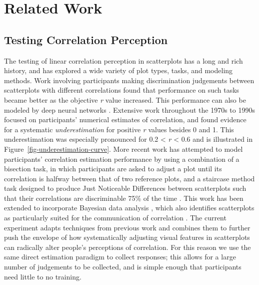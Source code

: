 \documentclass[sigconf]{acmart}
\begin{document}
\hypertarget{sec-related-work}{%
\section{Related Work}\label{sec-related-work}}

\hypertarget{sec-testing-corr-percept}{%
\subsection{Testing Correlation
Perception}\label{sec-testing-corr-percept}}

The testing of linear correlation perception in scatterplots has a long
and rich history, and has explored a wide variety of plot types, tasks,
and modeling methods. Work involving participants making discrimination
judgements between scatterplots with different correlations
\citep{pollack_1960, doherty_2007} found that performance on such tasks
became better as the objective \emph{r} value increased. This
performance can also be modeled by deep neural networks
\citep{yang_2023}. Extensive work throughout the 1970s to 1990s focused
on participants' numerical estimates of correlation, and found evidence
for a systematic \emph{underestimation} for positive \emph{r} values
besides 0 and 1. This underestimation was especially pronounced for 0.2
\textless{} \emph{r} \textless{} 0.6
\citep{strahan_1978, bobko_1979, cleveland_1982, lane_1985, lauer_1989, collyer_1990, meyer_1992}
and is illustrated in Figure~\ref{fig-underestimation-curve}. More
recent work has attempted to model participants' correlation estimation
performance by using a combination of a bisection task, in which
participants are asked to adjust a plot until its correlation is halfway
between that of two reference plots, and a staircase method task
designed to produce Just Noticeable Differences between scatterplots
such that their correlations are discriminable 75\% of the time
\citep{rensink_2010}. This work has been extended to incorporate
Bayesian data analysis \citep{kay_2015}, which also identifies
scatterplots as particularly suited for the communication of correlation
\citep{li_2010, harrison_2014}. The current experiment adapts techniques
from previous work \citep{strain_2023, strain_2023b} and combines them
to further push the envelope of how systematically adjusting visual
features in scatterplots can radically alter people's perceptions of
correlation. For this reason we use the same direct estimation paradigm
to collect responses; this allows for a large number of judgements to be
collected, and is simple enough that participants need little to no
training.
\end{document}

